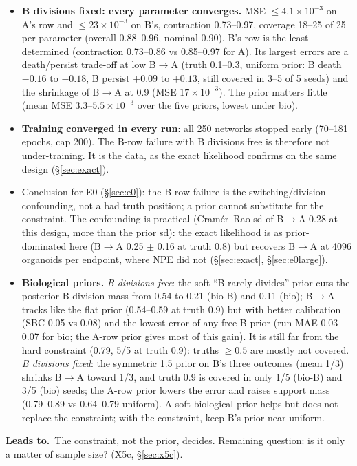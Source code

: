 \documentclass[10pt,a4paper]{article}
\newcommand{\Leads}[1]{\begin{leadbox}{\sffamily\bfseries\color{caqua!70!black}Leads to.}\ #1\end{leadbox}}
\newcommand{\sref}[1]{\S\ref{#1}}
\begin{document}
\begin{itemize}
\item \textbf{B divisions fixed: every parameter converges.} MSE $\le 4.1\times10^{-3}$ on A's row and $\le 23\times10^{-3}$ on B's, contraction 0.73--0.97, coverage 18--25 of 25 per parameter (overall 0.88--0.96, nominal 0.90). B's row is the least determined (contraction 0.73--0.86 vs 0.85--0.97 for A). Its largest errors are a death/persist trade-off at low B$\to$A (truth 0.1--0.3, uniform prior: B death $-0.16$ to $-0.18$, B persist $+0.09$ to $+0.13$, still covered in 3--5 of 5 seeds) and the shrinkage of B$\to$A at 0.9 (MSE $17\times10^{-3}$). The prior matters little (mean MSE $3.3$--$5.5\times10^{-3}$ over the five priors, lowest under bio).
\item \textbf{Training converged in every run}: all 250 networks stopped early (70--181 epochs, cap 200). The B-row failure with B divisions free is therefore not under-training. It is the data, as the exact likelihood confirms on the same design (\S\ref{sec:exact}).
\item Conclusion for E0 (\S\ref{sec:e0}): the B-row failure is the switching/division confounding, not a bad truth position; a prior cannot substitute for the constraint. The confounding is practical (Cram\'er--Rao sd of B$\to$A 0.28 at this design, more than the prior sd): the exact likelihood is as prior-dominated here (B$\to$A 0.25 $\pm$ 0.16 at truth 0.8) but recovers B$\to$A at 4096 organoids per endpoint, where NPE did not (\S\ref{sec:exact}, \S\ref{sec:e0large}).
\item \textbf{Biological priors.} \emph{B divisions free}: the soft ``B rarely divides'' prior cuts the posterior B-division mass from 0.54 to 0.21 (bio-B) and 0.11 (bio); B$\to$A tracks like the flat prior (0.54--0.59 at truth 0.9) but with better calibration (SBC 0.05 vs 0.08) and the lowest error of any free-B prior (run MAE 0.03--0.07 for bio; the A-row prior gives most of this gain). It is still far from the hard constraint (0.79, 5/5 at truth 0.9): truths $\ge 0.5$ are mostly not covered. \emph{B divisions fixed}: the symmetric 1.5 prior on B's three outcomes (mean 1/3) shrinks B$\to$A toward 1/3, and truth 0.9 is covered in only 1/5 (bio-B) and 3/5 (bio) seeds; the A-row prior lowers the error and raises support mass (0.79--0.89 vs 0.64--0.79 uniform). A soft biological prior helps but does not replace the constraint; with the constraint, keep B's prior near-uniform.
\end{itemize}
\Leads{The constraint, not the prior, decides. Remaining question: is it only a matter of sample size? (X5c, \sref{sec:x5c}).}
\end{document}
